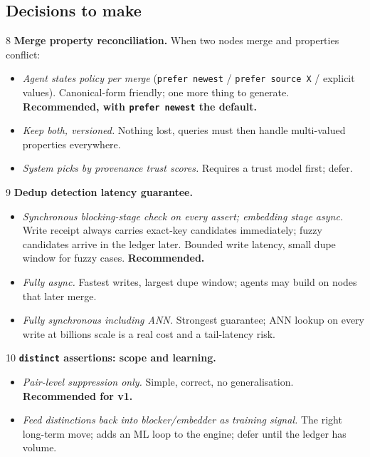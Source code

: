 \documentclass[11pt]{article}
\begin{document}
\subsection{Decisions to make}

\begin{decisionbox}{8}
\textbf{Merge property reconciliation.} When two nodes merge and properties conflict:
\begin{itemize}[leftmargin=1.4em,itemsep=1pt]
  \item[A.] \emph{Agent states policy per merge} (\texttt{prefer newest} / \texttt{prefer source X} / explicit values). Canonical-form friendly; one more thing to generate. \textbf{Recommended, with \texttt{prefer newest} the default.}
  \item[B.] \emph{Keep both, versioned.} Nothing lost, queries must then handle multi-valued properties everywhere.
  \item[C.] \emph{System picks by provenance trust scores.} Requires a trust model first; defer.
\end{itemize}
\end{decisionbox}

\begin{decisionbox}{9}
\textbf{Dedup detection latency guarantee.}
\begin{itemize}[leftmargin=1.4em,itemsep=1pt]
  \item[A.] \emph{Synchronous blocking-stage check on every assert; embedding stage async.} Write receipt always carries exact-key candidates immediately; fuzzy candidates arrive in the ledger later. Bounded write latency, small dupe window for fuzzy cases. \textbf{Recommended.}
  \item[B.] \emph{Fully async.} Fastest writes, largest dupe window; agents may build on nodes that later merge.
  \item[C.] \emph{Fully synchronous including ANN.} Strongest guarantee; ANN lookup on every write at billions scale is a real cost and a tail-latency risk.
\end{itemize}
\end{decisionbox}

\begin{decisionbox}{10}
\textbf{\texttt{distinct} assertions: scope and learning.}
\begin{itemize}[leftmargin=1.4em,itemsep=1pt]
  \item[A.] \emph{Pair-level suppression only.} Simple, correct, no generalisation. \textbf{Recommended for v1.}
  \item[B.] \emph{Feed distinctions back into blocker/embedder as training signal.} The right long-term move; adds an ML loop to the engine; defer until the ledger has volume.
\end{itemize}
\end{decisionbox}
\end{document}
